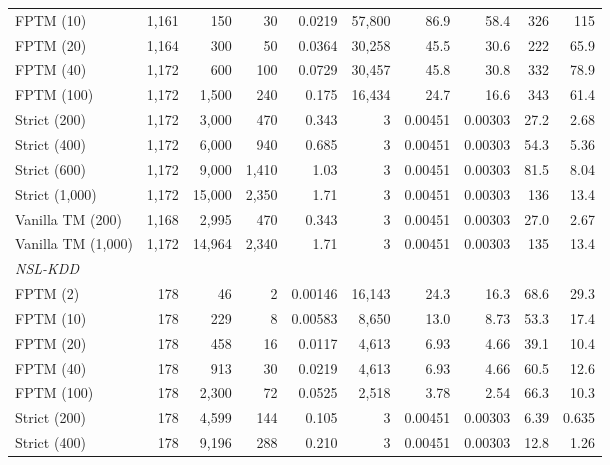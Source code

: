 \documentclass[preprint,12pt]{elsarticle}
\newcommand{\hyp}[1]{#1}
\begin{document}
\begin{table}
\begin{tabular}{lrrrrrrrrr}
FPTM (10) & 1,161 & 150 & 30 & \hyp{0.0219} & 57,800 & \hyp{86.9} & \hyp{58.4} & \hyp{326} & \hyp{115} \\
FPTM (20) & 1,164 & 300 & 50 & \hyp{0.0364} & 30,258 & \hyp{45.5} & \hyp{30.6} & \hyp{222} & \hyp{65.9} \\
FPTM (40) & 1,172 & 600 & 100 & \hyp{0.0729} & 30,457 & \hyp{45.8} & \hyp{30.8} & \hyp{332} & \hyp{78.9} \\
FPTM (100) & 1,172 & 1,500 & 240 & \hyp{0.175} & 16,434 & \hyp{24.7} & \hyp{16.6} & \hyp{343} & \hyp{61.4} \\
Strict (200) & 1,172 & 3,000 & 470 & \hyp{0.343} & 3 & \hyp{0.00451} & \hyp{0.00303} & \hyp{27.2} & \hyp{2.68} \\
Strict (400) & 1,172 & 6,000 & 940 & \hyp{0.685} & 3 & \hyp{0.00451} & \hyp{0.00303} & \hyp{54.3} & \hyp{5.36} \\
Strict (600) & 1,172 & 9,000 & 1,410 & \hyp{1.03} & 3 & \hyp{0.00451} & \hyp{0.00303} & \hyp{81.5} & \hyp{8.04} \\
Strict (1,000) & 1,172 & 15,000 & 2,350 & \hyp{1.71} & 3 & \hyp{0.00451} & \hyp{0.00303} & \hyp{136} & \hyp{13.4} \\
Vanilla TM (200) & 1,168 & 2,995 & 470 & \hyp{0.343} & 3 & \hyp{0.00451} & \hyp{0.00303} & \hyp{27.0} & \hyp{2.67} \\
Vanilla TM (1,000) & 1,172 & 14,964 & 2,340 & \hyp{1.71} & 3 & \hyp{0.00451} & \hyp{0.00303} & \hyp{135} & \hyp{13.4} \\
\midrule
\multicolumn{10}{l}{\textit{NSL-KDD}} \\
FPTM (2) & 178 & 46 & 2 & \hyp{0.00146} & 16,143 & \hyp{24.3} & \hyp{16.3} & \hyp{68.6} & \hyp{29.3} \\
FPTM (10) & 178 & 229 & 8 & \hyp{0.00583} & 8,650 & \hyp{13.0} & \hyp{8.73} & \hyp{53.3} & \hyp{17.4} \\
FPTM (20) & 178 & 458 & 16 & \hyp{0.0117} & 4,613 & \hyp{6.93} & \hyp{4.66} & \hyp{39.1} & \hyp{10.4} \\
FPTM (40) & 178 & 913 & 30 & \hyp{0.0219} & 4,613 & \hyp{6.93} & \hyp{4.66} & \hyp{60.5} & \hyp{12.6} \\
FPTM (100) & 178 & 2,300 & 72 & \hyp{0.0525} & 2,518 & \hyp{3.78} & \hyp{2.54} & \hyp{66.3} & \hyp{10.3} \\
Strict (200) & 178 & 4,599 & 144 & \hyp{0.105} & 3 & \hyp{0.00451} & \hyp{0.00303} & \hyp{6.39} & \hyp{0.635} \\
Strict (400) & 178 & 9,196 & 288 & \hyp{0.210} & 3 & \hyp{0.00451} & \hyp{0.00303} & \hyp{12.8} & \hyp{1.26} \\

\end{tabular}
\end{table}
\end{document}
